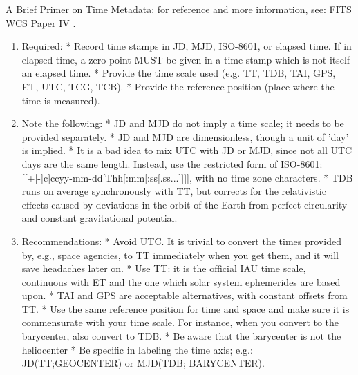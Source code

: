     A Brief Primer on Time Metadata; for reference and more information, see: FITS WCS Paper IV \citep{2015A+A...574A..36R}.
    \begin{enumerate}
    \item  Required:\newline
     * Record time stamps in JD, MJD, ISO-8601, or elapsed time. If in elapsed time, a zero point MUST be given in a time stamp which is not itself an elapsed time. \newline
     * Provide the time scale used (e.g. TT, TDB, TAI, GPS, ET, UTC, TCG, TCB). \newline
     * Provide the reference position (place where the time is measured).
    \item  Note the following:  \newline
     * JD and MJD do not imply a time scale; it needs to be provided separately.  \newline
     * JD and MJD are dimensionless, though a unit of 'day' is implied.  \newline
     * It is a bad idea to mix UTC with JD or MJD, since not all UTC days are the same length. Instead, use the restricted form of ISO-8601: [[+|-]c]ccyy-mm-dd[Thh[:mm[:ss[.ss...]]]], with no time zone characters. \newline
     * TDB runs on average synchronously with TT, but corrects for the relativistic effects caused by deviations in the orbit of the Earth from perfect circularity and constant gravitational potential. \newline
    \item Recommendations:  \newline
     * Avoid UTC. It is trivial to convert the times provided by, e.g., space agencies, to TT immediately when you get them, and it will save headaches later on.  \newline
     * Use TT: it is the official IAU time scale, continuous with ET and the one which solar system ephemerides are based upon.  \newline
     * TAI and GPS are acceptable alternatives, with constant offsets from TT.  \newline
     * Use the same reference position for time and space and make sure it is commensurate with your time scale. For instance, when you convert to the barycenter, also convert to TDB.  \newline
     * Be aware that the barycenter is not the heliocenter  \newline
     * Be specific in labeling the time axis; e.g.: JD(TT;GEOCENTER) or MJD(TDB; BARYCENTER).  \newline

\end{enumerate}
